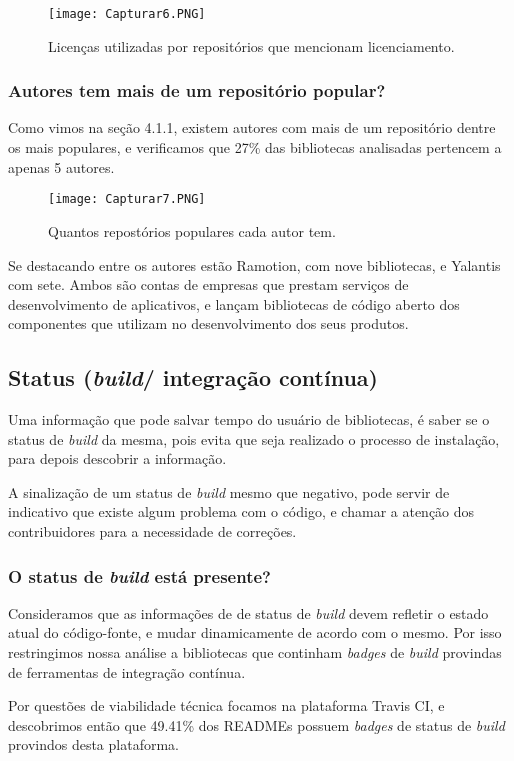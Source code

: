 \documentclass[preprint,12pt,authoryear]{elsarticle}
\begin{document}
\begin{figure}[!htb]
\centering
\texttt{[image: Capturar6.PNG]}
\caption{Licenças utilizadas por repositórios que mencionam licenciamento.}
\end{figure}


\subsubsection{Autores tem mais de um repositório popular?}
Como vimos na seção 4.1.1, existem autores com mais de um repositório dentre os mais populares, e verificamos que 27\% das bibliotecas analisadas pertencem a apenas 5 autores.

\begin{figure}[!htb]
\centering
\texttt{[image: Capturar7.PNG]}
\caption{Quantos repostórios populares cada autor tem.}
\end{figure}

Se destacando entre os autores estão Ramotion, com nove bibliotecas, e Yalantis com sete. Ambos são contas de empresas que prestam serviços de desenvolvimento de aplicativos, e lançam bibliotecas de código aberto dos componentes que utilizam no desenvolvimento dos seus produtos.


\subsection{Status (\textit{build}/ integração contínua)}
Uma informação que pode salvar tempo do usuário de bibliotecas, é saber se o status de \textit{build} da mesma, pois evita que seja realizado o processo de instalação, para depois descobrir a informação.

A sinalização de um status de \textit{build} mesmo que negativo, pode servir de indicativo que existe algum problema com o código, e chamar a atenção dos contribuidores para a necessidade de correções.

\subsubsection{O status de \textit{build} está presente?}
Consideramos que as informações de de status de \textit{build} devem refletir o estado atual do código-fonte, e mudar dinamicamente de acordo com o mesmo. Por isso restringimos nossa análise a bibliotecas que continham \textit{badges} de \textit{build} provindas de ferramentas de integração contínua.

Por questões de viabilidade técnica focamos na plataforma Travis CI, e descobrimos então que 49.41\% dos READMEs possuem \textit{badges} de status de \textit{build} provindos desta plataforma.
\end{document}
